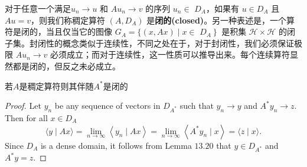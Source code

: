 对于任意一个满足\(u_{n} \rightarrow u\) 和 \(A u_{n} \rightarrow v\) 的序列 \(u_{n} \in\) \( D_{A}\)，如果有 \(u \in D_{A}\) 且 \(A u=v\)，则我们称稠定算符 \(\left(A, D_{A}\right)\) 是\textbf{闭的(closed)}。另一种表述是，一个算符是闭的，当且仅当它的图像 \(G_{A}=\{(x, A x) \mid x \in\) \(\left.D_{A} \right\}\) 是积集 \(\mathcal{H} \times \mathcal{H}\) 的闭子集。封闭性的概念类似于连续性，不同之处在于，对于封闭性，我们必须保证极限 \(A u_{n} \rightarrow v\) 必须成立；而对于连续性，这一性质可以推导出来。每个连续算符显然都是闭的，但反之未必成立。
\begin{theorem}\label{thm:13.21}
    若\(A\)是稠定算符则其伴随\(A^*\)是闭的
\end{theorem}
\begin{proof}
     Let \(y_{n}\) be any sequence of vectors in \(D_{A^{*}}\) such that \(y_{n} \rightarrow y\) and \(A^{*} y_{n} \rightarrow z\). Then for all \(x \in D_{A}\)
\[
\langle y \mid A x\rangle=\lim _{n \rightarrow \infty}\left\langle y_{n} \mid A x\right\rangle=\lim _{n \rightarrow \infty}\left\langle A^{*} y_{n} \mid x\right\rangle=\langle z \mid x\rangle .
\]
Since \(D_{A}\) is a dense domain, it follows from Lemma \(13.20\) that \(y \in D_{A^{*}}\) and \(A^{*} y=z\).

\end{proof}
